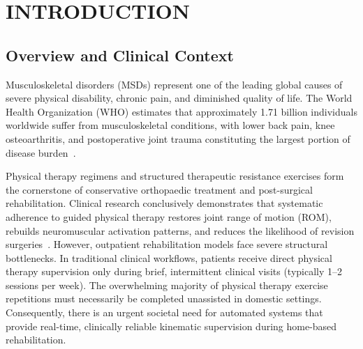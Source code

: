 \documentclass[12pt]{report}
\begin{document}
\renewcommand*{\contentsname}{\MakeUppercase{Contents}}
\renewcommand*{\listfigurename}{\MakeUppercase{List of Figures}}
\renewcommand*{\listtablename}{\MakeUppercase{List of Tables}}
\renewcommand{\bibname}{REFERENCES}

\tableofcontents
\clearpage

\begingroup
{}
\listoffigures
\clearpage
\endgroup

\begingroup
{}
\listoftables
\clearpage
\endgroup

\renewcommand{\chaptername}{CHAPTER}
\setcounter{page}{1}

\chapter{INTRODUCTION}

\section{Overview and Clinical Context}
Musculoskeletal disorders (MSDs) represent one of the leading global causes of severe physical disability, chronic pain, and diminished quality of life. The World Health Organization (WHO) estimates that approximately 1.71 billion individuals worldwide suffer from musculoskeletal conditions, with lower back pain, knee osteoarthritis, and postoperative joint trauma constituting the largest portion of disease burden~\cite{who2022musculoskeletal}. 

Physical therapy regimens and structured therapeutic resistance exercises form the cornerstone of conservative orthopaedic treatment and post-surgical rehabilitation. Clinical research conclusively demonstrates that systematic adherence to guided physical therapy restores joint range of motion (ROM), rebuilds neuromuscular activation patterns, and reduces the likelihood of revision surgeries~\cite{schoenfeld2010mechanisms, escamilla2001knee}. However, outpatient rehabilitation models face severe structural bottlenecks. In traditional clinical workflows, patients receive direct physical therapy supervision only during brief, intermittent clinical visits (typically 1--2 sessions per week). The overwhelming majority of physical therapy exercise repetitions must necessarily be completed unassisted in domestic settings. Consequently, there is an urgent societal need for automated systems that provide real-time, clinically reliable kinematic supervision during home-based rehabilitation.
\end{document}
